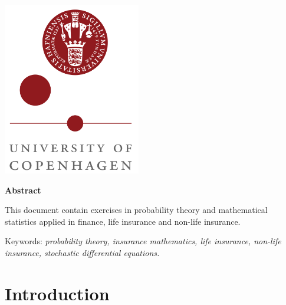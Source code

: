 \documentclass[
]{book}
\begin{document}
{\begin{titlepage}




\includegraphics[width = 0.45\textwidth]{logo_ku.png}%
 

\vfill %
\end{titlepage}

\thispagestyle{empty}
\begin{center}
\textbf{\large Abstract}
\end{center}

This document contain exercises in probability theory and mathematical statistics applied in finance, life insurance and non-life insurance.

Keywords: \emph{probability theory, insurance mathematics, life insurance,
non-life insurance, stochastic differential equations.}
\vfill
\pagebreak

\setcounter{tocdepth}{3}
\tableofcontents
}
\thispagestyle{empty}
\newpage
\setcounter{page}{1}
\pagestyle{fancy}
\fancyhf{}
\fancyhead[LE]{\fontsize{10}{12} \selectfont\nouppercase{\rightmark\hfill\leftmark}}
\fancyhead[RO]{\fontsize{10}{12} \selectfont\nouppercase{\leftmark\hfill\rightmark}}
\fancyfoot[LE,RO]{\hfill\thepage\hfill}
\hypertarget{introduction}{%
\chapter{Introduction}\label{introduction}}
\end{document}
